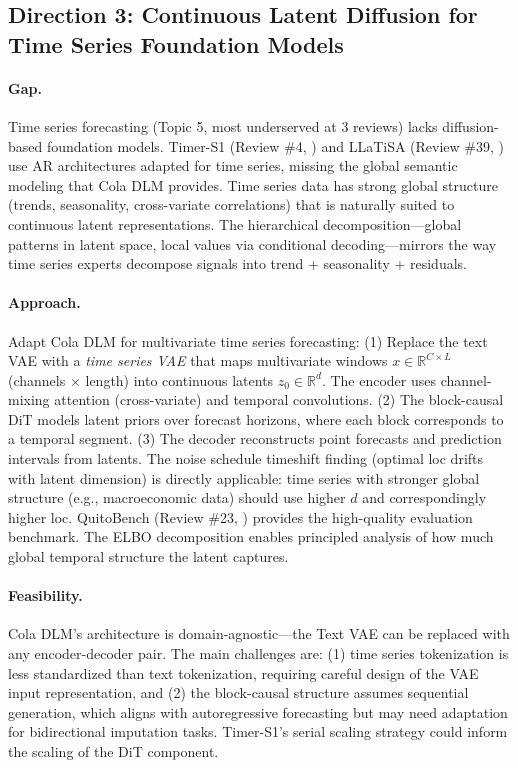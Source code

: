\documentclass[11pt]{article}
\begin{document}
\subsection{Direction 3: Continuous Latent Diffusion for Time Series Foundation Models}

\paragraph{Gap.}
Time series forecasting (Topic 5, most underserved at 3 reviews) lacks diffusion-based foundation models. Timer-S1 (Review \#4, \cite{timers1}) and LLaTiSA (Review \#39, \cite{llatisa}) use AR architectures adapted for time series, missing the global semantic modeling that Cola DLM provides. Time series data has strong global structure (trends, seasonality, cross-variate correlations) that is naturally suited to continuous latent representations. The hierarchical decomposition---global patterns in latent space, local values via conditional decoding---mirrors the way time series experts decompose signals into trend + seasonality + residuals.

\paragraph{Approach.}
Adapt Cola DLM for multivariate time series forecasting: (1) Replace the text VAE with a \emph{time series VAE} that maps multivariate windows $x \in \mathbb{R}^{C \times L}$ (channels $\times$ length) into continuous latents $z_0 \in \mathbb{R}^d$. The encoder uses channel-mixing attention (cross-variate) and temporal convolutions. (2) The block-causal DiT models latent priors over forecast horizons, where each block corresponds to a temporal segment. (3) The decoder reconstructs point forecasts and prediction intervals from latents. The noise schedule timeshift finding (optimal loc drifts with latent dimension) is directly applicable: time series with stronger global structure (e.g., macroeconomic data) should use higher $d$ and correspondingly higher loc. QuitoBench (Review \#23, \cite{quitobench}) provides the high-quality evaluation benchmark. The ELBO decomposition enables principled analysis of how much global temporal structure the latent captures.

\paragraph{Feasibility.}
Cola DLM's architecture is domain-agnostic---the Text VAE can be replaced with any encoder-decoder pair. The main challenges are: (1) time series tokenization is less standardized than text tokenization, requiring careful design of the VAE input representation, and (2) the block-causal structure assumes sequential generation, which aligns with autoregressive forecasting but may need adaptation for bidirectional imputation tasks. Timer-S1's serial scaling strategy could inform the scaling of the DiT component.
\end{document}
